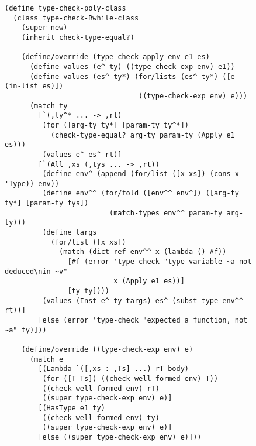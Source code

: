 \documentclass[11pt]{book}
\begin{document}
\begin{figure}[tbp]
\begin{lstlisting}
(define type-check-poly-class
  (class type-check-Rwhile-class
    (super-new)
    (inherit check-type-equal?)
  
    (define/override (type-check-apply env e1 es)
      (define-values (e^ ty) ((type-check-exp env) e1))
      (define-values (es^ ty*) (for/lists (es^ ty*) ([e (in-list es)])
                                ((type-check-exp env) e)))
      (match ty
        [`(,ty^* ... -> ,rt)
         (for ([arg-ty ty*] [param-ty ty^*])
           (check-type-equal? arg-ty param-ty (Apply e1 es)))
         (values e^ es^ rt)]
        [`(All ,xs (,tys ... -> ,rt))
         (define env^ (append (for/list ([x xs]) (cons x 'Type)) env))
         (define env^^ (for/fold ([env^^ env^]) ([arg-ty ty*] [param-ty tys])
                         (match-types env^^ param-ty arg-ty)))
         (define targs
           (for/list ([x xs])
             (match (dict-ref env^^ x (lambda () #f))
               [#f (error 'type-check "type variable ~a not deduced\nin ~v"
                          x (Apply e1 es))]
               [ty ty])))
         (values (Inst e^ ty targs) es^ (subst-type env^^ rt))]
        [else (error 'type-check "expected a function, not ~a" ty)]))
    
    (define/override ((type-check-exp env) e)
      (match e
        [(Lambda `([,xs : ,Ts] ...) rT body)
         (for ([T Ts]) ((check-well-formed env) T))
         ((check-well-formed env) rT)
         ((super type-check-exp env) e)]
        [(HasType e1 ty)
         ((check-well-formed env) ty)
         ((super type-check-exp env) e)]
        [else ((super type-check-exp env) e)]))
\end{lstlisting}
\end{figure}
\end{document}

